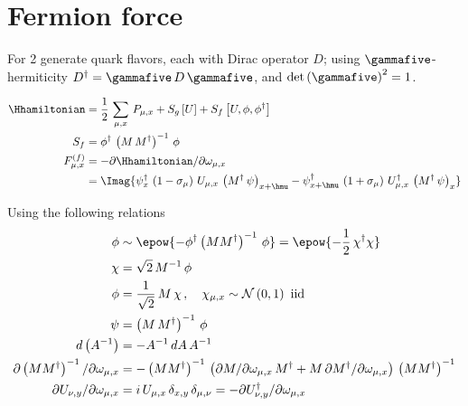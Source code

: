 \section{Fermion force}

For 2 generate quark flavors, each with Dirac operator $D$; using $\gammafive$-hermiticity $D^{\dagger} = \gammafive\,D\,\gammafive$,
and $\mathrm{det}\left( \gammafive \right)^2 = 1$.

\newcommand{\psidag}{\psi^{\dagger}}
\newcommand{\chidag}{\chi^{\dagger}}
\newcommand{\phidag}{\phi^{\dagger}}
\newcommand{\Mdag}{M^{\dagger}}

\begin{align}
  \Hhamiltonian &= \frac{1}{2}\,\sum\limits_{\mu,x}\,P_{\mu,x} +  S_g\left[ U \right] + S_f\left[ U,\phi,\phidag \right]
  \label{eq:ff-1} \\
  S_f &= \phidag\,\left( M\,\Mdag \right)^{-1}\,\phi
  \label{eq:ff-2} \\
  F^{(f)}_{\mu,x} &= -\partial \Hhamiltonian / \partial \omega_{\mu,x}
  \label{eq:ff-3} \\
  &= \Imag{ 
    \psi_x^{\dagger}\,\left( 1-\sigma_\mu \right)\,U_{\mu,x}\,\left( \Mdag\,\psi \right)_{x+\hmu}
    - \psi_{x+\hmu}^{\dagger}\,\left( 1+\sigma_\mu \right)\,U_{\mu,x}^{\dagger}\,\left( \Mdag\,\psi \right)_{x}
}
\nonumber
\end{align}

Using the following relations
\begin{align}
  \phi &\sim \epow{-\phidag\left( M\Mdag \right)^{-1}\,\phi} = \epow{- \frac{1}{2}\,\chidag\chi} 
  \nonumber\\
  \chi &= \sqrt{2}\,M^{-1}\,\phi
  \nonumber \\
  \phi &= \frac{1}{\sqrt{2}}\,M\,\chi \,,\quad \chi_{\mu,x} \sim \mathcal{N}\left( 0,1 \right) \mathrm{~iid}
\label{eq:ff-4} \\
\psi &= \left( M\,\Mdag \right)^{-1}\,\phi
\label{eq:ff-5} \\
d\left( A^{-1} \right) &= -A^{-1} \,dA\,A^{-1} \nonumber\\
\partial \left( M\Mdag \right)^{-1} / \partial \omega_{\mu,x} &=
%
-\left( M\Mdag \right)^{-1} \,\left( 
\partial M  / \partial \omega_{\mu,x}\,\Mdag
+  M\,\partial \Mdag  / \partial \omega_{\mu,x}
\right) \,\left( M\Mdag \right)^{-1} 
\nonumber \\
\partial U_{\nu,y} / \partial \omega_{\mu,x} &= i\,U_{\mu,x}\,\delta_{x,y}\,\delta_{\mu,\nu}
= - \partial U_{\nu,y}^{\dagger} / \partial \omega_{\mu,x}
\nonumber
\end{align}

